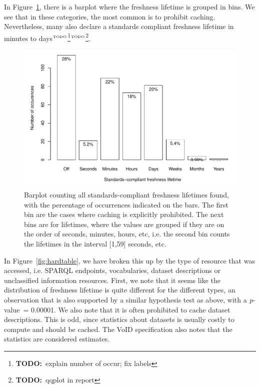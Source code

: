 \documentclass{llncs}
\newcommand{\pvalue}{\textit{p}-value\ }
\newcommand{\todo}[1]{\ensuremath{^{\textrm{\tiny{TODO}\normalsize}}}\footnote{\textbf{TODO:}~#1}}
\begin{document}
In Figure~\ref{fig:hardall}, there is a barplot where
the freshness lifetime is grouped in bins. We see that in these
categories, the most common is to prohibit caching. Nevertheless, many
also declare a standards compliant freshness lifetime in minutes to
days\todo{explain number of occur; fix labels}\todo{qqplot in report}.

\begin{figure}[ht]
  \centerline{%
    \includegraphics[width=.9\textwidth]{hardall.pdf}}
  \caption{Barplot counting all standards-compliant freshness lifetimes
    found, with the percentage of occurrences indicated on the
    bars. The first bin are the cases where caching is explicitly
    prohibited. The next bins are for lifetimes, where the values are
    grouped if they are on the order of seconds, minutes, hours, etc,
    i.e. the second bin counts the lifetimes in the interval [1,59]
    seconds, etc.}
  \label{fig:hardall}
\end{figure}



In Figure~\ref{fig:hardtable}, we have broken this
up by the type of resource that was accessed, i.e. SPARQL endpoints,
vocabularies, dataset descriptions or unclassified information
resources. First, we note that it seems like the distribution of
freshness lifetime is quite different for the different types, an
observation that is also supported by a similar hypothesis test as
above, with a \pvalue = 0.00001. We also note that it is often
prohibited to cache dataset descriptions. This is odd, since
statistics about datasets is usually costly to compute and should be
cached. The VoID specification \cite{voidnote} also notes that the
statistics are considered estimates.
\end{document}
